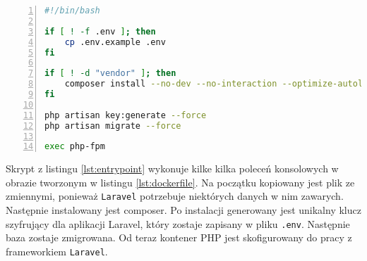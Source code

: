 \newpage
\begin{lstlisting}[language=bash, caption=Skrypt entrypoint.sh, label={lst:entrypoint}, numbers=left, frame=single]
#!/bin/bash

if [ ! -f .env ]; then
    cp .env.example .env
fi

if [ ! -d "vendor" ]; then
    composer install --no-dev --no-interaction --optimize-autoloader
fi

php artisan key:generate --force
php artisan migrate --force

exec php-fpm
\end{lstlisting}

Skrypt z listingu \ref{lst:entrypoint} wykonuje kilke kilka poleceń konsolowych w obrazie tworzonym w listingu \ref{lst:dockerfile}. Na początku kopiowany jest plik ze zmiennymi, ponieważ \verb|Laravel| potrzebuje niektórych danych w nim zawarych. Następnie instalowany jest composer.
Po instalacji generowany jest unikalny klucz szyfrujący dla aplikacji Laravel, który zostaje zapisany w pliku \verb|.env|. Następnie baza zostaje zmigrowana. Od teraz kontener PHP jest skofigurowany do pracy z frameworkiem \verb|Laravel|.